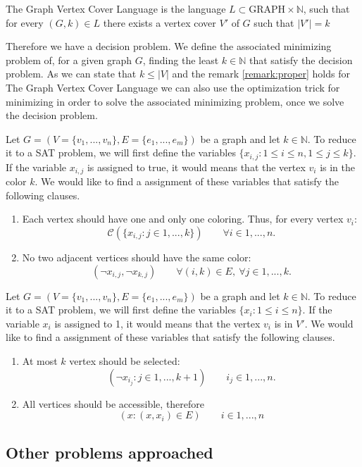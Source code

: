 \begin{definition}
  The Graph Vertex Cover Language is the language $L \subset \text{GRAPH} \times \mathbb{N}$, such that for every $( G, k ) \in L$ there exists a vertex cover $V'$  of $G$ such that $ |V'|= k$
\end{definition}

Therefore we have a decision problem. We define the associated minimizing problem of, for a given graph $G$, finding the least $k\in \mathbb{N}$ that satisfy the decision problem. As we can state that $k\le |V|$ and the remark \ref{remark:proper} holds for The Graph Vertex Cover Language  we can also use the optimization trick for minimizing in order to solve the associated minimizing problem, once we solve the decision problem. 


Let $G=(V=\{ v_1,...,v_n\},E= \{e_1,...,e_m\})$ be a graph and let $k\in \mathbb{N}$. To reduce it to a SAT problem, we will first define the variables $\{x_{i,j} : 1\le i \le n,  1 \le j \le k\}$. If the variable $x_{i,j}$ is assigned to true, it would means that the vertex $v_i$ is in the color $k$. We would like to find a assignment of these variables that satisfy the following clauses.
\begin{enumerate}
\item Each vertex should have one and only one coloring. Thus, for every vertex $v_i$:
  $$\mathcal{C}( \{x_{i,j} : j \in 1,...,k \}) \qquad \forall i \in 1,...,n.$$
\item No two adjacent vertices should have the same color:
$$(\neg x_{i,j}, \neg x_{k,j}) \qquad \forall (i,k) \in E,\ \forall j \in 1,...,k.$$
\end{enumerate}

Let $G=(V=\{ v_1,...,v_n\},E= \{e_1,...,e_m\})$ be a graph and let $k\in \mathbb{N}$. To reduce it to a SAT problem, we will first define the variables $\{x_{i} : 1\le i \le n\}$. If the variable $x_{i}$ is assigned to 1, it would means that the vertex $v_i$ is in $V'$. We would like to find a assignment of these variables that satisfy the following clauses.
\begin{enumerate}
\item At most $k$ vertex should be selected:
  $$(\neg x_{i_j} : j\in 1,...,k +1 ) \qquad  i_j \in 1,...,n.$$
\item All vertices should be accessible, therefore
$$ ( x : (x,x_i)\in E ) \qquad i \in 1,...,n $$
\end{enumerate}

\subsection{Other problems approached}
